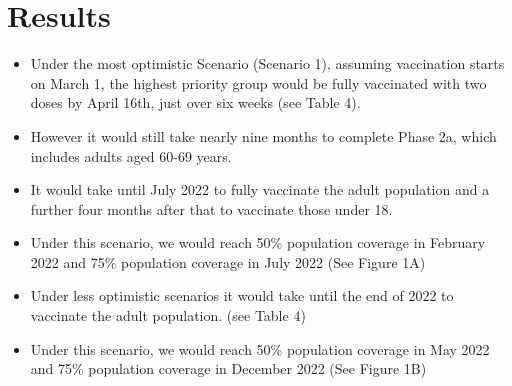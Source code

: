 \documentclass{article}
\begin{document}
\hypertarget{results}{%
\section{Results}\label{results}}

\begin{itemize}
\item
  Under the most optimistic Scenario (Scenario 1), assuming vaccination
  starts on March 1, the highest priority group would be fully
  vaccinated with two doses by April 16th, just over six weeks (see
  Table 4).
\item
  However it would still take nearly nine months to complete Phase 2a,
  which includes adults aged 60-69 years.
\item
  It would take until July 2022 to fully vaccinate the adult population
  and a further four months after that to vaccinate those under 18.
\item
  Under this scenario, we would reach 50\% population coverage in
  February 2022 and 75\% population coverage in July 2022 (See Figure
  1A)
\item
  Under less optimistic scenarios it would take until the end of 2022 to
  vaccinate the adult population. (see Table 4)
\item
  Under this scenario, we would reach 50\% population coverage in May
  2022 and 75\% population coverage in December 2022 (See Figure 1B)
\end{itemize}
\end{document}
